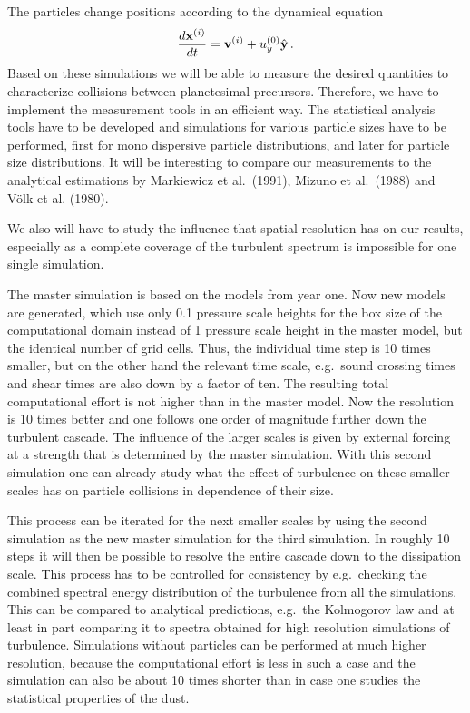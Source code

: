 The particles change positions according to the dynamical equation
\begin{equation}
  \frac{d {\bf x}^{(i)}}{d t} = {\bf v}^{(i)} + u_y^{(0)} \hat{\bf{y}} \, .
\end{equation}
Based on these simulations we will be able to measure the desired quantities
to characterize collisions between planetesimal precursors.  Therefore, we
have to implement the measurement tools in an efficient way. The statistical
analysis tools have to be developed and simulations for various particle
sizes have to be performed, first for mono dispersive particle
distributions, and later for particle size distributions.  It will be
interesting to compare our measurements to the analytical estimations by
Markiewicz et al.~(1991), Mizuno et al.~(1988) and V\"olk et al. (1980).

We also will have to study the influence that spatial resolution has on
our results, especially as a complete coverage of the turbulent spectrum
is impossible for one single simulation. 

The master simulation is based on the models from year one. Now new models
are generated, which use only 0.1 pressure scale heights for the box size of
the computational domain instead of 1 pressure scale height in the master
model, but the identical number of grid cells.  Thus, the individual time
step is 10 times smaller, but on the other hand the relevant time scale,
e.g.\ sound crossing times and shear times are also down by a factor of
ten. The resulting total computational effort is not higher than in the
master model.  Now the resolution is 10 times better and one follows one
order of magnitude further down the turbulent cascade. The influence of the
larger scales is given by external forcing at a strength that is determined
by the master simulation. With this second simulation one can already study
what the effect of turbulence on these smaller scales has on particle
collisions in dependence of their size.

This process can be iterated for the next smaller scales by using the second
simulation as the new master simulation for the third simulation. In roughly
10 steps it will then be possible to resolve the entire cascade down to the
dissipation scale. This process has to be controlled for consistency by
e.g.\ checking the combined spectral energy distribution of the turbulence
from all the simulations. This can be compared to analytical predictions,
e.g.\ the Kolmogorov law and at least in part comparing it to spectra
obtained for high resolution simulations of turbulence. Simulations without
particles can be performed at much higher resolution, because the
computational effort is less in such a case and the simulation can also be
about 10 times shorter than in case one studies the statistical properties
of the dust.

